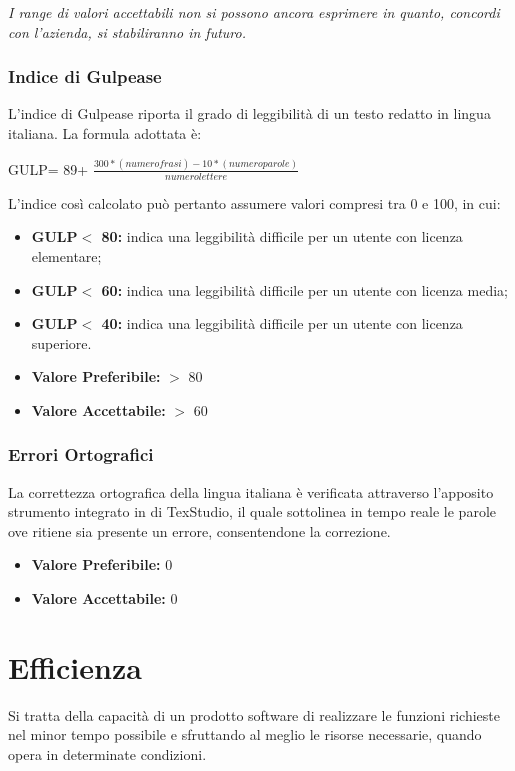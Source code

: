 \textit{I range di valori accettabili non si possono ancora esprimere in quanto, concordi con l'azienda, si stabiliranno in futuro.}
\subsubsection{Indice di Gulpease} \label{3.3.1.2}
L’indice di Gulpease riporta il grado di leggibilità di un testo redatto in lingua italiana.
La formula adottata è:
\begin{center}
	GULP= 89+ $\frac{300*(numero frasi)-10*(numero parole)}{numero lettere}$
\end{center}
L'indice così calcolato può pertanto assumere valori compresi tra 0 e 100, in cui:
\begin{itemize}
	\item \textbf{GULP$<$ 80:} indica una leggibilità difficile per un utente con licenza elementare;
	\item \textbf{GULP$<$ 60:} indica una leggibilità difficile per un utente con licenza media;
	\item \textbf{GULP$<$ 40:} indica una leggibilità difficile per un utente con licenza superiore.
\end{itemize}
\begin{itemize}
	\item \textbf{Valore Preferibile:} $>$ 80 
	\item \textbf{Valore  Accettabile:} $>$ 60
\end{itemize}
\subsubsection{Errori Ortografici} \label{3.3.1.3}
La correttezza ortografica della lingua italiana è verificata attraverso l’apposito strumento integrato in di TexStudio, il quale sottolinea in tempo reale le parole ove ritiene sia presente un errore, consentendone la correzione.
\begin{itemize}
	\item \textbf{Valore Preferibile:} 0
	\item \textbf{Valore  Accettabile:} 0
\end{itemize}

\section{Efficienza} \label{3.4}
Si tratta della capacità di un prodotto software di realizzare le funzioni richieste nel minor tempo possibile e sfruttando al meglio le risorse necessarie, quando opera in determinate condizioni. 
